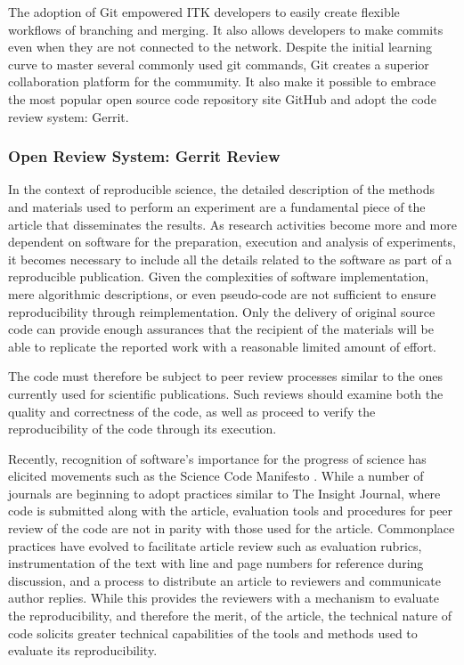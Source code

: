 \documentclass{frontiersENG} %
\begin{document}
The adoption of Git empowered ITK developers to easily create flexible
workflows of branching and merging. It also allows developers to
make commits even when they are not connected to the network. Despite the
initial learning curve to master several commonly used git commands, Git creates
a superior collaboration platform for the commumity.  It also make it possible
to embrace the most popular open source code repository site GitHub and adopt
the code review system: Gerrit.


\subsubsection{Open Review System: Gerrit Review} In the context of
reproducible science, the detailed description of the methods and materials
used to perform an experiment are a fundamental piece of the article that
disseminates the results. As research activities become more and more dependent
on software for the preparation, execution and analysis of experiments, it
becomes necessary to include all the details related to the software as part of
a reproducible publication. Given the complexities of software implementation,
mere algorithmic descriptions, or even pseudo-code are not sufficient to ensure
reproducibility through reimplementation. Only the delivery of original source
code can provide enough assurances that the recipient of the materials will be
able to replicate the reported work with a reasonable limited amount of effort.

The code must therefore be subject to peer review processes similar to the ones
currently used for scientific publications. Such reviews should examine both
the quality and correctness of the code, as well as proceed to verify the
reproducibility of the code through its execution.

Recently, recognition of software’s importance for the progress of science has
elicited movements such as the Science Code Manifesto \cite{Barnes2010}. While
a number of journals are beginning to adopt practices similar to The Insight
Journal, where code is submitted along with the article, evaluation tools and
procedures for peer review of the code are not in parity with those used for
the article.  Commonplace practices have evolved to facilitate article review
such as evaluation rubrics, instrumentation of the text with line and page
numbers for reference during discussion, and a process to distribute an article
to reviewers and communicate author replies.  While this provides the reviewers
with a mechanism to evaluate the reproducibility, and therefore the merit, of
the article, the technical nature of code solicits greater technical
capabilities of the tools and methods used to evaluate its reproducibility.
\end{document}
